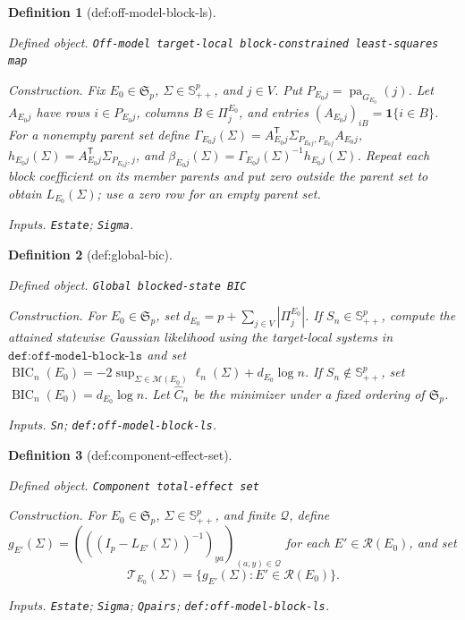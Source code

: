 \documentclass{article}
\newtheorem{definition}{Definition}
\begin{document}
\begin{definition}[def:off-model-block-ls]\label{def:off-model-block-ls}
\par\smallskip\noindent\emph{Defined object.} \texttt{Off-\allowbreak{}model target-\allowbreak{}local block-\allowbreak{}constrained least-\allowbreak{}squares map}
\par\smallskip\noindent\emph{Construction.} Fix \(E_0\in\mathfrak S_p\), \(\Sigma\in\mathbb S^p_{++}\), and \(j\in V\). Put \(P_{E_0j}=\operatorname{pa}_{G_{E_0}}(j)\). Let \(A_{E_0j}\) have rows \(i\in P_{E_0j}\), columns \(B\in\Pi^{E_0}_j\), and entries \((A_{E_0j})_{iB}=\mathbf 1\{i\in B\}\). For a nonempty parent set define \(\Gamma_{E_0j}(\Sigma)=A_{E_0j}^{\mathsf T}\Sigma_{P_{E_0j},P_{E_0j}}A_{E_0j}\), \(h_{E_0j}(\Sigma)=A_{E_0j}^{\mathsf T}\Sigma_{P_{E_0j},j}\), and \(\beta_{E_0j}(\Sigma)=\Gamma_{E_0j}(\Sigma)^{-1}h_{E_0j}(\Sigma)\). Repeat each block coefficient on its member parents and put zero outside the parent set to obtain \(L_{E_0}(\Sigma)\); use a zero row for an empty parent set.
\par\smallskip\noindent\emph{Inputs.} \texttt{Estate}; \texttt{Sigma}.
\end{definition}

\begin{definition}[def:global-bic]\label{def:global-bic}
\par\smallskip\noindent\emph{Defined object.} \texttt{Global blocked-\allowbreak{}state BIC}
\par\smallskip\noindent\emph{Construction.} For \(E_0\in\mathfrak S_p\), set \(d_{E_0}=p+\sum_{j\in V}|\Pi^{E_0}_j|\). If \(S_n\in\mathbb S^p_{++}\), compute the attained statewise Gaussian likelihood using the target-local systems in \(\texttt{def:off-model-block-ls}\) and set \(\operatorname{BIC}_n(E_0)=-2\sup_{\Sigma\in\mathcal M(E_0)}\ell_n(\Sigma)+d_{E_0}\log n\). If \(S_n\notin\mathbb S^p_{++}\), set \(\operatorname{BIC}_n(E_0)=d_{E_0}\log n\). Let \(\widehat C_n\) be the minimizer under a fixed ordering of \(\mathfrak S_p\).
\par\smallskip\noindent\emph{Inputs.} \texttt{Sn}; \texttt{def:\allowbreak{}off-\allowbreak{}model-\allowbreak{}block-\allowbreak{}ls}.
\end{definition}

\begin{definition}[def:component-effect-set]\label{def:component-effect-set}
\par\smallskip\noindent\emph{Defined object.} \texttt{Component total-\allowbreak{}effect set}
\par\smallskip\noindent\emph{Construction.} For \(E_0\in\mathfrak S_p\), \(\Sigma\in\mathbb S^p_{++}\), and finite \(\mathcal Q\), define \(g_{E'}(\Sigma)=(((I_p-L_{E'}(\Sigma))^{-1})_{ya})_{(a,y)\in\mathcal Q}\) for each \(E'\in\mathcal R(E_0)\), and set \[\mathcal T_{E_0}(\Sigma)=\{g_{E'}(\Sigma):E'\in\mathcal R(E_0)\}.\]
\par\smallskip\noindent\emph{Inputs.} \texttt{Estate}; \texttt{Sigma}; \texttt{Qpairs}; \texttt{def:\allowbreak{}off-\allowbreak{}model-\allowbreak{}block-\allowbreak{}ls}.
\end{definition}
\end{document}
